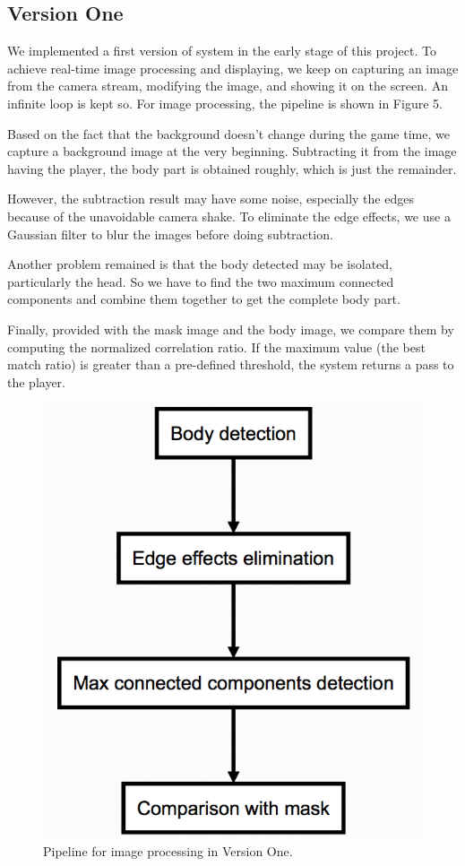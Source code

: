 \documentclass[11pt,twocolumn,letterpaper]{article}
\begin{document}
	\subsection{Version One}
        \par We implemented a first version of system in the early stage of this project. To achieve real-time image processing and displaying, we keep on capturing an image from the camera stream, modifying the image, and showing it on the screen. An infinite loop is kept so. For image processing, the pipeline is shown in Figure 5.
        \par Based on the fact that the background doesn't change during the game time, we capture a background image at the very beginning. Subtracting it from the image having the player, the body part is obtained roughly, which is just the remainder.
        \par However, the subtraction result may have some noise, especially the edges because of the unavoidable camera shake. To eliminate the edge effects, we use a Gaussian filter to blur the images before doing subtraction.
        \par Another problem remained is that the body detected may be isolated, particularly the head. So we have to find the two maximum connected components and combine them together to get the complete body part.
        \par Finally, provided with the mask image and the body image, we compare them by computing the normalized correlation ratio. If the maximum value (the best match ratio) is greater than a pre-defined threshold, the system returns a pass to the player.
        \begin{figure}[htbp]
			\centering
			\includegraphics[width=0.9\linewidth]{./Pic/flowchart.png}
			\caption{Pipeline for image processing in Version One.}
		\end{figure}
\end{document}
